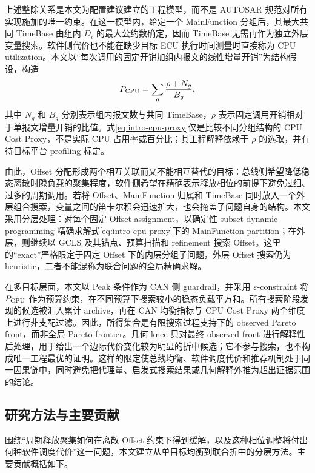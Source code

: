 \documentclass[UTF8,12pt,a4paper]{ctexart}
\begin{document}
上述整除关系是本文为配置建议建立的工程模型，而不是 AUTOSAR 规范对所有实现施加的唯一约束。在这一模型内，给定一个 MainFunction 分组后，其最大共同 TimeBase 由组内 $D_i$ 的最大公约数确定，因而 TimeBase 无需再作为独立外层变量搜索。软件侧代价也不能在缺少目标 ECU 执行时间测量时直接称为 CPU utilization。本文以“每次调用的固定开销加组内报文的线性增量开销”为结构假设，构造
\begin{equation}
 P_{\rm CPU}=\sum_g\frac{\rho+N_g}{B_g},
\label{eq:intro-cpu-proxy}
\end{equation}
其中 $N_g$ 和 $B_g$ 分别表示组内报文数与共同 TimeBase，$\rho$ 表示固定调用开销相对于单报文增量开销的比值。式\eqref{eq:intro-cpu-proxy}仅是比较不同分组结构的 CPU Cost Proxy，不是实际 CPU 占用率或百分比；其工程解释依赖于 $\rho$ 的选取，并有待目标平台 profiling 标定。

由此，Offset 分配形成两个相互关联而又不能相互替代的目标：总线侧希望降低稳态离散时隙负载的聚集程度，软件侧希望在精确表示释放相位的前提下避免过细、过多的周期调用。若将 Offset、MainFunction 归属和 TimeBase 同时放入一个外层组合搜索，变量之间的笛卡尔积会迅速扩大，也会掩盖子问题自身的结构。本文采用分层处理：对每个固定 Offset assignment，以确定性 subset dynamic programming 精确求解式\eqref{eq:intro-cpu-proxy}下的 MainFunction partition；在外层，则继续以 GCLS 及其锚点、预算扫描和 refinement 搜索 Offset。这里的“exact”严格限定于固定 Offset 下的内层分组子问题，外层 Offset 搜索仍为 heuristic，二者不能混称为联合问题的全局精确求解。

在多目标层面，本文以 Peak 条件作为 CAN 侧 guardrail，并采用 $\varepsilon$-constraint 将 $P_{\rm CPU}$ 作为预算约束，在不同预算下搜索较小的稳态负载平方和。所有搜索阶段发现的候选被汇入累计 archive，再在 CAN 均衡指标与 CPU Cost Proxy 两个维度上进行非支配过滤。因此，所得集合是有限搜索过程支持下的 observed Pareto front，而非全局 Pareto frontier。几何 knee 只对最终 observed front 进行解释性后处理，用于给出一个边际代价变化较为明显的折中候选；它不参与搜索，也不构成唯一工程最优的证明。这样的限定使总线均衡、软件调度代价和推荐机制处于同一因果链中，同时避免把代理量、启发式搜索结果或几何解释外推为超出证据范围的结论。

\subsection{研究方法与主要贡献}

围绕“周期释放聚集如何在离散 Offset 约束下得到缓解，以及这种相位调整将付出何种软件调度代价”这一问题，本文建立从单目标均衡到联合折中的分层方法。主要贡献概括如下。
\end{document}
